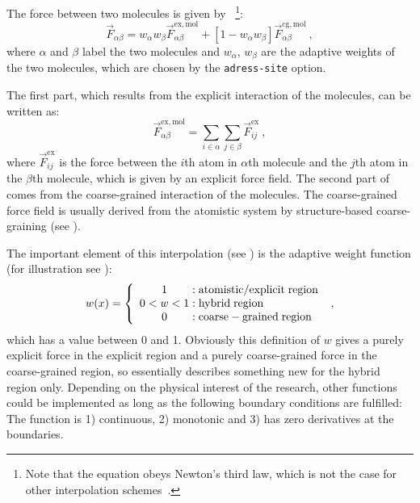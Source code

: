 The force between two molecules is given by~\cite{Praprotnik2005}
\footnote{Note that the equation obeys Newton's third law, which is not the case for other interpolation schemes~\cite{DelleSite2007}.}:
\begin{equation}
\vec{F}_{\alpha\beta}=w_\alpha w_\beta \vec{F}^\mathrm{ex,mol}_{\alpha\beta} + \left[1-w_\alpha w_\beta\right] \vec{F}^\mathrm{cg,mol}_{\alpha\beta}~,
\label{eqn:interpolation}
\end{equation}
where $\alpha$ and $\beta$ label the two molecules and $w_\alpha$, $w_\beta$ are the adaptive weights of the two molecules, which are chosen by the {\tt adress-site} option.

The first part, which results from the explicit interaction of the molecules, can be written as:
\begin{equation}
\vec{F}^\mathrm{ex,mol}_{\alpha\beta}=\sum_{i\in\alpha}\sum_{j\in\beta} \vec{F}^\mathrm{ex}_{ij}~,
\end{equation}
where $\vec{F}^\mathrm{ex}_{ij}$ is the force between the $i$th atom  in  $\alpha$th molecule and the $j$th atom in the $\beta$th molecule, which is given by an explicit force field.
The second part of  comes from the coarse-grained interaction of the molecules.
The coarse-grained force field is usually derived from the atomistic system by structure-based coarse-graining (see ).

The important element of this interpolation (see ) is the adaptive weight function (for illustration see ):
\begin{equation}
w(x)=
\left\{\begin{array}{c@{\;:\;}l}
1&\mathrm{atomistic/explicit\;region}\\
0<w<1&\mathrm{hybrid\;region}\\
0&\mathrm{coarse-grained\;region}
\end{array}\right.~,
\label{equ:weighting}
\end{equation}
which has a value between 0 and 1.
Obviously this definition of $w$ gives a purely explicit force in the explicit region and a purely coarse-grained force in the coarse-grained region,
so essentially  describes something new for the hybrid region only.
Depending on the physical interest of the research, other functions could be implemented as long as the following boundary conditions are fulfilled:
The function is 1) continuous, 2) monotonic and 3) has zero derivatives at the boundaries.

